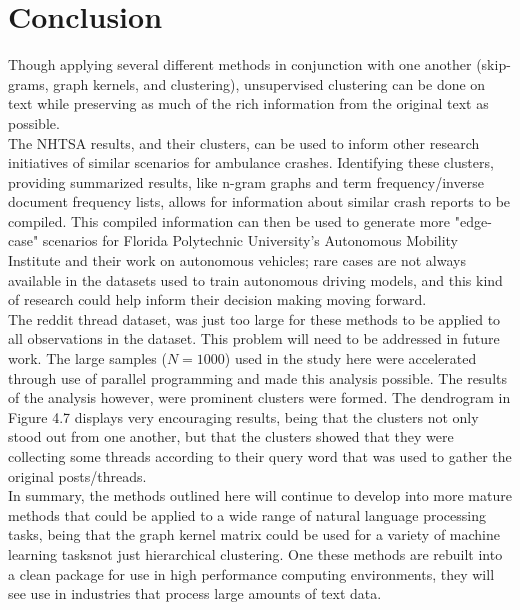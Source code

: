 %
%
%

\chapter{Conclusion}

Though applying several different methods in conjunction with one another (skip-grams, graph kernels, and clustering), unsupervised clustering can be done on text while preserving as much of the rich information from the original text as possible. \\
The NHTSA results, and their clusters, can be used to inform other research initiatives of similar scenarios for ambulance crashes. Identifying these clusters, providing summarized results, like n-gram graphs and term frequency/inverse document frequency lists, allows for information about similar crash reports to be compiled. This compiled information can then be used to generate more "edge-case" scenarios for Florida Polytechnic University's Autonomous Mobility Institute and their work on autonomous vehicles; rare cases are not always available in the datasets used to train autonomous driving models, and this kind of research could help inform their decision making moving forward.\\
The reddit thread dataset, was just too large for these methods to be applied to all observations in the dataset. This problem will need to be addressed in future work. The large samples ($N=1000$) used in the study here were accelerated through use of parallel programming and made this analysis possible. The results of the analysis however, were prominent clusters were formed. The dendrogram in Figure 4.7 displays very encouraging results, being that the clusters not only stood out from one another, but that the clusters showed that they were collecting some threads according to their query word that was used to gather the original posts/threads. \\
In summary, the methods outlined here will continue to develop into more mature methods that could be applied to a wide range of natural language processing tasks, being that the graph kernel matrix could be used for a variety of machine learning tasks\textemdash not just hierarchical clustering. One these methods are rebuilt into a clean package for use in high performance computing environments, they will see use in industries that process large amounts of text data.\\
